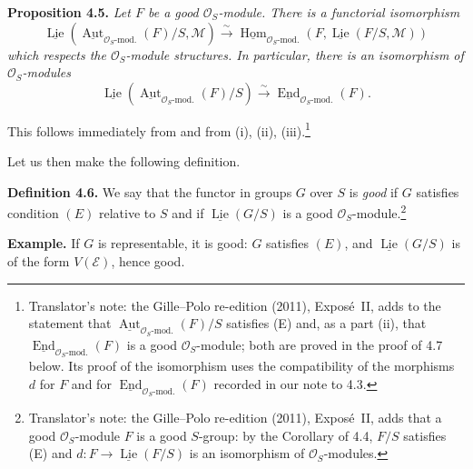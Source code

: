 

\medskip
\noindent{}\textbf{Proposition 4.5.}
\textit{Let \(F\) be a good \(\mathcal O_S\)-module. There is a functorial
isomorphism}
\[
 \underline{\operatorname{Lie}}\!
   \left(\underline{\operatorname{Aut}}_{\mathcal O_S\text{-mod.}}(F)/S,
         \mathcal M\right)
 \xrightarrow{\sim}
 \underline{\operatorname{Hom}}_{\mathcal O_S\text{-mod.}}
   \left(F,\underline{\operatorname{Lie}}(F/S,\mathcal M)\right)
\]
\textit{which respects the \(\mathcal O_S\)-module structures. In
particular, there is an isomorphism of \(\mathcal O_S\)-modules}
\[
 \underline{\operatorname{Lie}}\!
   \left(\underline{\operatorname{Aut}}_{\mathcal O_S\text{-mod.}}(F)/S\right)
 \xrightarrow{\sim}
 \underline{\operatorname{End}}_{\mathcal O_S\text{-mod.}}(F).
\]

This follows immediately from  and from (i), (ii), (iii).\footnote{Translator's
note: the Gille--Polo re-edition (2011), Expos\'e~II, adds to the statement
that \(\underline{\operatorname{Aut}}_{\mathcal O_S\text{-mod.}}(F)/S\)
satisfies (E) and, as a part (ii), that
\(\underline{\operatorname{End}}_{\mathcal O_S\text{-mod.}}(F)\) is a good
\(\mathcal O_S\)-module; both are proved in the proof of 4.7 below. Its
proof of the isomorphism uses the compatibility of the morphisms \(d\) for
\(F\) and for \(\underline{\operatorname{End}}_{\mathcal O_S\text{-mod.}}(F)\)
recorded in our note to 4.3.}

Let us then make the following definition.

\medskip
\noindent{}\textbf{Definition 4.6.}
We say that the functor in groups \(G\) over \(S\) is \emph{good} if
\(G\) satisfies condition \((E)\) relative to \(S\) and if
\(\underline{\operatorname{Lie}}(G/S)\) is a good
\(\mathcal O_S\)-module.\footnote{Translator's note: the Gille--Polo
re-edition (2011), Expos\'e~II, adds that a good \(\mathcal O_S\)-module
\(F\) is a good \(S\)-group: by the Corollary of 4.4, \(F/S\) satisfies (E)
and \(d\colon F\to\underline{\operatorname{Lie}}(F/S)\) is an isomorphism
of \(\mathcal O_S\)-modules.}

\medskip
\noindent{}\textbf{Example.}
If \(G\) is representable, it is good: \(G\) satisfies \((E)\), and
\(\underline{\operatorname{Lie}}(G/S)\) is of the form \(V(\mathcal E)\),
hence good.

